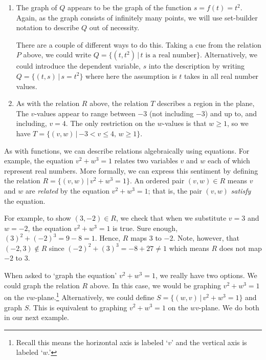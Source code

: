\documentclass{ximera}
\begin{document}
\begin{example}
\begin{explanation}
\begin{enumerate}
\begin{enumerate}
\item  The graph of $Q$ appears to be the graph of the function $s = f(t) = t^2$.  Again, as the graph consists of infinitely many points, we will use set-builder notation to describe $Q$ out of necessity.  

There are a couple of different ways to do this.  Taking a cue from the relation $P$ above, we could write $Q = \{ (t, t^2) \, | \, \text{$t$ is a real number} \}$.  Alternatively, we could introduce the dependent variable, $s$ into the description by  writing  $Q = \{ (t, s) \, | \, s = t^2 \}$ where here the assumption is $t$ takes in all real number values.
\item  As with the relation $R$ above, the relation $T$ describes a region in the plane,  The $v$-values appear to range between $-3$ (not including $-3$) and up to, and including, $v = 4$.  The only restriction on the $w$-values is that $w \geq 1$, so we have $T = \{ (v, w) \, | \, \text{$-3 < v \leq 4$, $w \geq 1$} \}$. 

\end{enumerate}
\end{enumerate}

\end{explanation}

\end{example}

As with functions, we can describe relations algebraically using equations.  For example, the equation $v^2+w^3 = 1$ relates two variables $v$ and $w$ each of which represent real numbers.  More formally, we can express this sentiment by defining the relation $R = \{ (v,w) \, | \, v^2+w^3 = 1\}$. An ordered pair $(v,w) \in R$ means $v$ and $w$ are  \textit{related} by the equation  $v^2+w^3 = 1$; that is, the pair $(v,w)$ \textit{satisfy} the equation.

For example, to show $(3,-2) \in R$, we check that when we substitute $v=3$ and $w=-2$, the equation $v^2+w^3 = 1$ is true. Sure enough, $(3)^2+(-2)^3 = 9  - 8 = 1$.  Hence, $R$ maps $3$ to $-2$.  Note, however, that $(-2,3) \notin R$ since $(-2)^2+(3)^3 = -8+27 \neq 1$ which means $R$ does not map $-2$ to $3$. 

When asked to `graph the equation'  $v^2+w^3 = 1$,  we really have two options.  We could graph the relation $R$ above.  In this case, we would be graphing $v^2+w^3 = 1$ on the $vw$-plane.\footnote{Recall this means the horizontal axis is labeled `$v$' and the vertical axis is labeled `$w$.'}   Alternatively, we  could define $S = \{ (w,v) \, | \, v^2+w^3 = 1 \}$ and graph $S$. This is equivalent to graphing $v^2+w^3 = 1$ on the $wv$-plane.  We do both in our next example.
\end{document}
